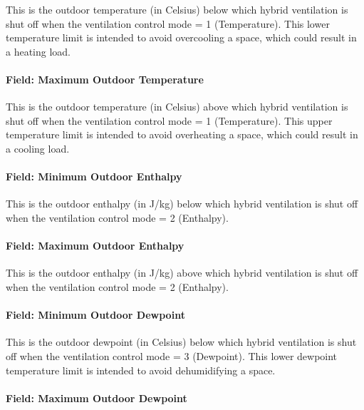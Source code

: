 This is the outdoor temperature (in Celsius) below which hybrid ventilation is shut off when the ventilation control mode = 1 (Temperature). This lower temperature limit is intended to avoid overcooling a space, which could result in a heating load.

\paragraph{Field: Maximum Outdoor Temperature}\label{field-maximum-outdoor-temperature-000}

This is the outdoor temperature (in Celsius) above which hybrid ventilation is shut off when the ventilation control mode = 1 (Temperature). This upper temperature limit is intended to avoid overheating a space, which could result in a cooling load.

\paragraph{Field: Minimum Outdoor Enthalpy}\label{field-minimum-outdoor-enthalpy}

This is the outdoor enthalpy (in J/kg) below which hybrid ventilation is shut off when the ventilation control mode = 2 (Enthalpy).

\paragraph{Field: Maximum Outdoor Enthalpy}\label{field-maximum-outdoor-enthalpy}

This is the outdoor enthalpy (in J/kg) above which hybrid ventilation is shut off when the ventilation control mode = 2 (Enthalpy).

\paragraph{Field: Minimum Outdoor Dewpoint}\label{field-minimum-outdoor-dewpoint}

This is the outdoor dewpoint (in Celsius) below which hybrid ventilation is shut off when the ventilation control mode = 3 (Dewpoint). This lower dewpoint temperature limit is intended to avoid dehumidifying a space.

\paragraph{Field: Maximum Outdoor Dewpoint}\label{field-maximum-outdoor-dewpoint}

